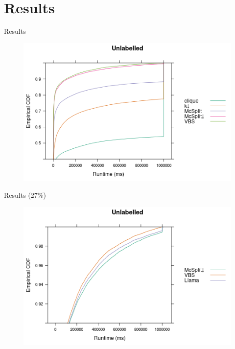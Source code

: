 \documentclass{beamer}
\begin{document}
\section{Results}
\begin{frame}{Results}
  \begin{figure}
    \centering
    \includegraphics[width=\textwidth]{../dissertation/images/ecdf_unlabelled.png}
  \end{figure}
\end{frame}

\begin{frame}{Results (27\%)}
  \begin{figure}
    \centering
    \includegraphics[width=\textwidth]{../dissertation/images/ecdf_unlabelled_llama.png}
  \end{figure}
\end{frame}
\end{document}
